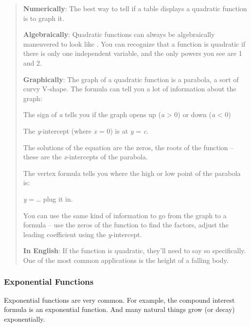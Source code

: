 \begin{quote}
\textbf{Numerically}: The best way to tell if a table displays a
quadratic function is to graph it.

\textbf{Algebraically}: Quadratic functions can always be algebraically
maneuvered to look like . You can recognize that a function is quadratic
if there is only one independent variable, and the only powers you see
are 1 and 2.

\textbf{Graphically}: The graph of a quadratic function is a parabola, a
sort of curvy V-shape. The formula can tell you a lot of information
about the graph:

The sign of \emph{a} tells you if the graph opens up (\emph{a}
\textgreater{} 0) or down (\emph{a} \textless{} 0)

The \emph{y}-intercept (where \emph{x} = 0) is at \emph{y} = \emph{c}.

The solutions of the equation are the zeros, the roots of the function
-- these are the \emph{x}-intercepts of the parabola.

The vertex formula tells you where the high or low point of the parabola
is:

\emph{y} = \ldots{} plug it in.

You can use the same kind of information to go from the graph to a
formula -- use the zeros of the function to find the factors, adjust the
leading coefficient using the \emph{y}-intercept.

\textbf{In English}: If the function is quadratic, they'll need to say
so specifically. One of the most common applications is the height of a
falling body.
\end{quote}

\subsubsection{Exponential Functions}\label{exponential-functions}

Exponential functions are very common. For example, the compound
interest formula is an exponential function. And many natural things
grow (or decay) exponentially.

